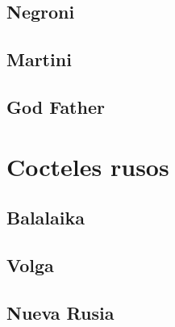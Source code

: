 \documentclass[a4paper]{spie}  %
\begin{document}
\subsection{Negroni}

\newpage

\newpage
\bigskip \bigskip \bigskip
\subsection{Martini}

\newpage

\newpage
\bigskip \bigskip \bigskip
\subsection{God Father}


\newpage
\section{Cocteles rusos}
\bigskip \bigskip \bigskip
\subsection{Balalaika}

\newpage

\newpage
\bigskip \bigskip \bigskip
\subsection{Volga}

\newpage

\newpage
\bigskip \bigskip \bigskip
\subsection{Nueva Rusia}

\end{document}
